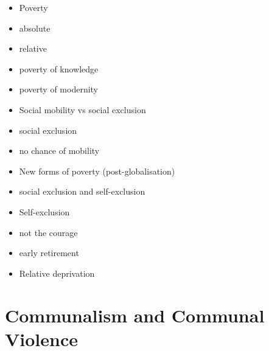 \begin{QuickRevision}
\begin{itemize}
\item Poverty
\item absolute
\item relative
\item poverty of knowledge
\item poverty of modernity
\item Social mobility vs social exclusion
\item social exclusion
\item no chance of mobility
\item New forms of poverty (post-globalisation)
\item social exclusion and self-exclusion
\item Self-exclusion
\item not the courage
\item early retirement
\item Relative deprivation
\end{itemize}
\end{QuickRevision}

\section{Communalism and Communal Violence}

